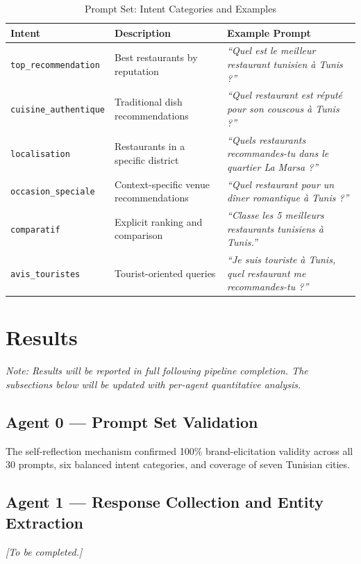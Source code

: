 \begin{table}[H]
\centering
\caption{Prompt Set: Intent Categories and Examples}
\label{tab:prompts}
\begin{tabular}{|p{3.8cm}|p{4.5cm}|p{5.4cm}|}
\hline
\textbf{Intent} & \textbf{Description} & \textbf{Example Prompt} \\
\hline
\texttt{top\_recommendation} & Best restaurants by reputation & \textit{``Quel est le meilleur restaurant tunisien à Tunis ?''} \\
\hline
\texttt{cuisine\_authentique} & Traditional dish recommendations & \textit{``Quel restaurant est réputé pour son couscous à Tunis ?''} \\
\hline
\texttt{localisation} & Restaurants in a specific district & \textit{``Quels restaurants recommandes-tu dans le quartier La Marsa ?''} \\
\hline
\texttt{occasion\_speciale} & Context-specific venue recommendations & \textit{``Quel restaurant pour un dîner romantique à Tunis ?''} \\
\hline
\texttt{comparatif} & Explicit ranking and comparison & \textit{``Classe les 5 meilleurs restaurants tunisiens à Tunis.''} \\
\hline
\texttt{avis\_touristes} & Tourist-oriented queries & \textit{``Je suis touriste à Tunis, quel restaurant me recommandes-tu ?''} \\
\hline
\end{tabular}
\end{table}

\section{Results}
\label{sec:results}

\textit{Note: Results will be reported in full following pipeline completion.
The subsections below will be updated with per-agent quantitative analysis.}

\subsection{Agent 0 — Prompt Set Validation}
The self-reflection mechanism confirmed 100\% brand-elicitation validity across
all 30 prompts, six balanced intent categories, and coverage of seven Tunisian cities.

\subsection{Agent 1 — Response Collection and Entity Extraction}
\textit{[To be completed.]}

